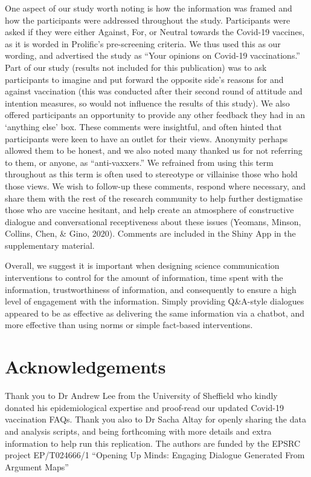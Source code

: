 \documentclass[
  english,
  ,jou,floatsintext]{apa6}
\begin{document}
One aspect of our study worth noting is how the information was framed and how the participants were addressed throughout the study. Participants were asked if they were either Against, For, or Neutral towards the Covid-19 vaccines, as it is worded in Prolific's pre-screening criteria. We thus used this as our wording, and advertised the study as ``Your opinions on Covid-19 vaccinations.'' Part of our study (results not included for this publication) was to ask participants to imagine and put forward the opposite side's reasons for and against vaccination (this was conducted after their second round of attitude and intention measures, so would not influence the results of this study). We also offered participants an opportunity to provide any other feedback they had in an `anything else' box. These comments were insightful, and often hinted that participants were keen to have an outlet for their views. Anonymity perhaps allowed them to be honest, and we also noted many thanked us for not referring to them, or anyone, as ``anti-vaxxers.'' We refrained from using this term throughout as this term is often used to stereotype or villainise those who hold those views. We wish to follow-up these comments, respond where necessary, and share them with the rest of the research community to help further destigmatise those who are vaccine hesitant, and help create an atmosphere of constructive dialogue and conversational receptiveness about these issues (Yeomans, Minson, Collins, Chen, \& Gino, 2020). Comments are included in the Shiny App in the supplementary material.

Overall, we suggest it is important when designing science communication interventions to control for the amount of information, time spent with the information, trustworthiness of information, and consequently to ensure a high level of engagement with the information. Simply providing Q\&A-style dialogues appeared to be as effective as delivering the same information via a chatbot, and more effective than using norms or simple fact-based interventions.

\hypertarget{acknowledgements}{%
\section{Acknowledgements}\label{acknowledgements}}

Thank you to Dr Andrew Lee from the University of Sheffield who kindly donated his epidemiological expertise and proof-read our updated Covid-19 vaccination FAQs.
Thank you also to Dr Sacha Altay for openly sharing the data and analysis scripts, and being forthcoming with more details and extra information to help run this replication. The authors are funded by the EPSRC project EP/T024666/1 ``Opening Up Minds: Engaging Dialogue Generated From Argument Maps''
\end{document}
